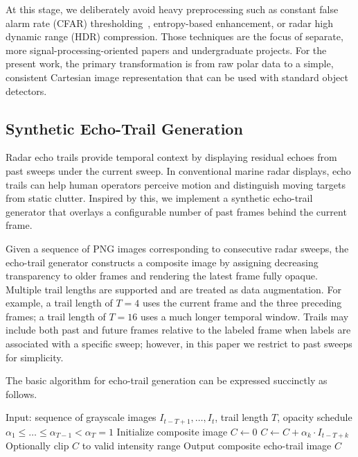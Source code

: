 \documentclass[conference]{IEEEtran}
\begin{document}
At this stage, we deliberately avoid heavy preprocessing such as constant false alarm rate (CFAR) thresholding~\cite{rashid2025cfar_sar_vessels}, entropy-based enhancement, or radar high dynamic range (HDR) compression. Those techniques are the focus of separate, more signal-processing-oriented papers and undergraduate projects. For the present work, the primary transformation is from raw polar data to a simple, consistent Cartesian image representation that can be used with standard object detectors.

\subsection{Synthetic Echo-Trail Generation}
Radar echo trails provide temporal context by displaying residual echoes from past sweeps under the current sweep. In conventional marine radar displays, echo trails can help human operators perceive motion and distinguish moving targets from static clutter. Inspired by this, we implement a synthetic echo-trail generator that overlays a configurable number of past frames behind the current frame.

Given a sequence of PNG images corresponding to consecutive radar sweeps, the echo-trail generator constructs a composite image by assigning decreasing transparency to older frames and rendering the latest frame fully opaque. Multiple trail lengths are supported and are treated as data augmentation. For example, a trail length of $T=4$ uses the current frame and the three preceding frames; a trail length of $T=16$ uses a much longer temporal window. Trails may include both past and future frames relative to the labeled frame when labels are associated with a specific sweep; however, in this paper we restrict to past sweeps for simplicity.

The basic algorithm for echo-trail generation can be expressed succinctly as follows.

\begin{algorithm}[t]
\caption{Synthetic Echo-Trail Generation}
\label{alg:echo}
\begin{algorithmic}
\State Input: sequence of grayscale images $I_{t-T+1}, \dots, I_{t}$, trail length $T$, opacity schedule $\alpha_{1} \leq \dots \leq \alpha_{T-1} < \alpha_{T}=1$
\State Initialize composite image $C \gets 0$
  \State $C \gets C + \alpha_{k} \cdot I_{t-T+k}$
\EndFor
\State Optionally clip $C$ to valid intensity range
\State Output composite echo-trail image $C$
\end{algorithmic}
\end{algorithm}
\end{document}
